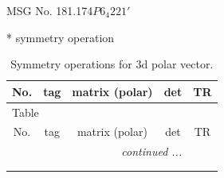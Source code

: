 \documentclass[fleqn,8pt]{jsarticle}
\begin{document}
\setcounter{MaxMatrixCols}{32}

\renewcommand{\tablename}{Table~}
\renewcommand{\figurename}{Figure~}
\begin{center}
\LARGE
MSG No. 181.174\quad$P6_{4}221'$
\end{center}
* symmetry operation
\renewcommand{\arraystretch}{1.3}
\begin{longtable}{ccccc}
\caption{Symmetry operations for 3d polar vector.}
 \\
 \hline \hline
No. & tag & matrix (polar) & det & TR \\ \hline \endfirsthead

\multicolumn{4}{l}{\tablename\ \thetable{}} \\
 \hline \hline
No. & tag & matrix (polar) & det & TR \\ \hline \endhead

 \hline \hline
\multicolumn{4}{r}{\footnotesize\it continued ...} \\ \endfoot

 \hline \hline
\multicolumn{4}{r}{} \\ \endlastfoot


\end{longtable}
\end{document}

